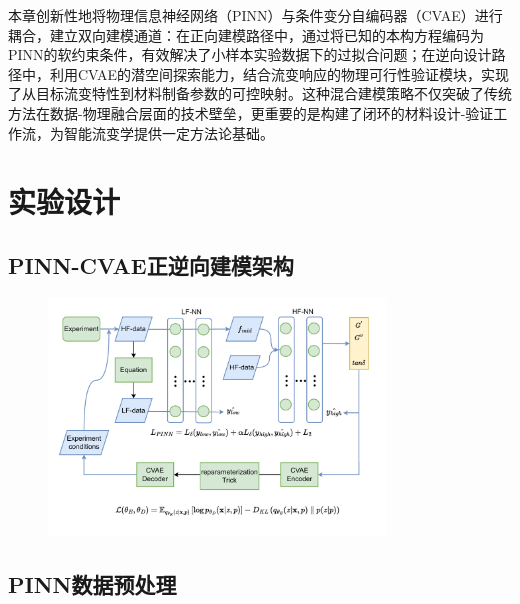本章创新性地将物理信息神经网络（PINN）与条件变分自编码器（CVAE）进行耦合，建立双向建模通道：在正向建模路径中，通过将已知的本构方程编码为PINN的软约束条件，有效解决了小样本实验数据下的过拟合问题；在逆向设计路径中，利用CVAE的潜空间探索能力，结合流变响应的物理可行性验证模块，实现了从目标流变特性到材料制备参数的可控映射。这种混合建模策略不仅突破了传统方法在数据-物理融合层面的技术壁垒，更重要的是构建了闭环的材料设计-验证工作流，为智能流变学提供一定方法论基础。
\section{实验设计}
\subsection{PINN-CVAE正逆向建模架构}
\begin{figure}[htbp]
  \centering
  \includegraphics[width=0.8\textwidth]{Fig/PINN-CVAE.pdf}
\end{figure}


\subsection{PINN数据预处理}
